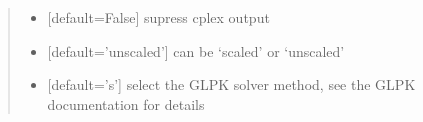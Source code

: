 \documentclass[letterpaper,12pt,english]{sphinxmanual}
\begin{document}
\begin{fulllineitems}
\begin{quote}
\begin{description}
\begin{itemize}
\item {} 
\sphinxAtStartPar
{} \textendash{} {[}default=False{]} supress cplex output

\item {} 
\sphinxAtStartPar
{} \textendash{} {[}default=’unscaled’{]} can be ‘scaled’ or ‘unscaled’

\item {} 
\sphinxAtStartPar
{} \textendash{} {[}default=’s’{]} select the GLPK solver method, see the GLPK documentation for details

\end{itemize}

\end{description}\end{quote}

\end{fulllineitems}

\end{document}
